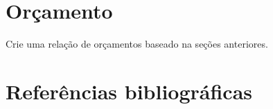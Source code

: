 \documentclass[	DIV=calc,%
							paper=a4,%
							fontsize=12pt,%
							onecolumn]{scrartcl}	 					%
\begin{document}
\section{Orçamento}
Crie uma relação de orçamentos baseado na seções anteriores.

\section{Referências bibliográficas}




\renewcommand\refname{} %

  






\end{document}

